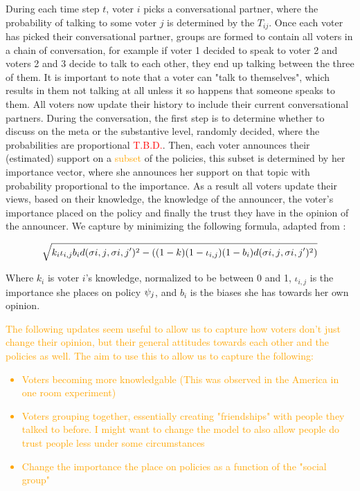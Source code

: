 During each time step $t$, voter $i$ picks a conversational partner, where the probability of talking to some voter $j$ is determined by the $T_{ij}$. Once each voter has picked their conversational partner, groups are formed to contain all voters in a chain of conversation, for example if voter 1 decided to speak to voter 2 and voters 2 and 3 decide to talk to each other, they end up talking between the three of them. It is important to note that a voter can "talk to themselves", which results in them not talking at all unless it so happens that someone speaks to them. All voters now update their history to include their current conversational partners. During the conversation, the first step is to determine whether to discuss on the meta or the substantive level, randomly decided, where the probabilities are proportional \textcolor{red}{T.B.D.}.
Then, each voter announces their (estimated) support on a \textcolor{orange}{subset} of the policies, this subset is determined by her importance vector, where she announces her support on that topic with probability proportional to the importance. As a result all voters update their views, based on their knowledge, the knowledge of the announcer, the voter's importance placed on the policy and finally the trust they have in the opinion of the announcer. We capture by minimizing the following formula, adapted from \citet{radDeliberationSinglePeakednessCoherent2021}:

\begin{equation}
	\label{eq:abm_update_function}
	\sqrt{k_{i}\iota_{i,j} b_{i}d(\sigma{i,j}, \sigma{i,j}')^{2} - ((1-k)(1-\iota_{i,j})(1-b_{i})d(\sigma{i,j}, \sigma{i,j}')^{2})}
\end{equation}

Where $k_{i}$ is voter $i$'s knowledge, normalized to be between 0 and 1, $\iota_{i,j}$ is the importance she places on policy $\psi_{j}$, and $b_{i}$ is the biases she has towards her own opinion.

\textcolor{orange}{The following updates seem useful to allow us to capture how voters don't just change their opinion, but their general attitudes towards each other and the policies as well. The aim to use this to allow us to capture the following:}
\textcolor{orange}{
\begin{itemize}
	\item Voters becoming more knowledgable (This was observed in the America in one room experiment)
	\item Voters grouping together, essentially creating "friendships" with people they talked to before. I might want to change the model to also allow people do trust people less under some circumstances
	\item Change the importance the place on policies as a function of the "social group"
\end{itemize}}

